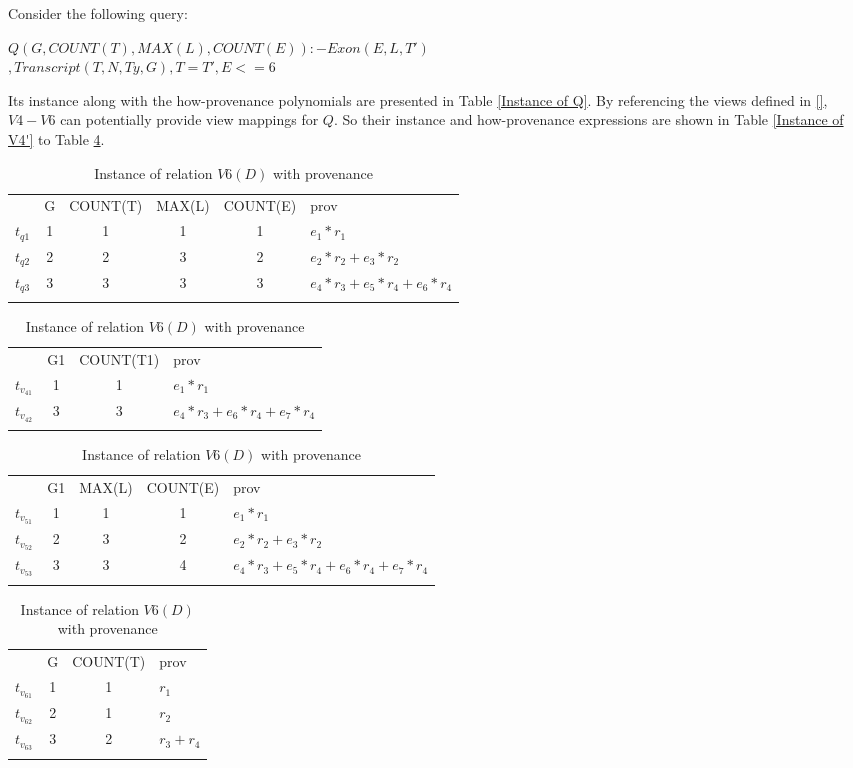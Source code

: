 \begin{example}
Consider the following query:
\begin{tabbing}
$Q(G, COUNT(T), MAX(L), COUNT(E)):-Exon(E, L, T')$\\
\tab\tab$,Transcript(T, N, Ty, G), T = T', E <= 6$
\end{tabbing}

Its instance along with the how-provenance polynomials are presented in Table \ref{Instance of Q}. By referencing the views defined in \ref{}, $V4-V6$ can potentially provide view mappings for $Q$. So their instance and how-provenance expressions are shown in Table \ref{Instance of V4'} to Table \ref{Instance of V6'}.

\begin{table}[htp]
\centering
\small
\caption{$Q(D)$ with how-provenance polynomials}\label{Instance of Q}
\begin{tabular}[t]{c|c|c|c|c||b|} \hhline{~-----}
&G&COUNT(T)&MAX(L)&COUNT(E)&prov\\ \hhline{~-----}
$t_{q1}$&1&1&1&1&$e_1*r_1$\\ \hhline{~-----}
$t_{q2}$&2&2&3&2&$e_2*r_2 + e_3*r_2$\\ \hhline{~-----}
$t_{q3}$&3&3&3&3&$e_4*r_3 + e_5*r_4 + e_6*r_4$\\ \hhline{~-----}
\end{tabular}
\bigskip
\caption{$V_4(D)$ with how-provenance polynomials}\label{Instance of V4'}
\begin{tabular}[t]{c|c|c||b|} \hhline{~---}
&G1&COUNT(T1)&prov\\ \hhline{~---}
$t_{v_41}$&1&1&$e_1*r_1$\\ \hhline{~---}
$t_{v_42}$&3&3&$e_4*r_3 + e_6*r_4 + e_7*r_4$\\ \hhline{~---}
\end{tabular}
\bigskip
\caption{$V_5(D)$ with how-provenance polynomials}\label{Instance of V5'}
\begin{tabular}[t]{c|c|c|c||b|} \hhline{~----}
&G1&MAX(L)&COUNT(E)&prov\\ \hhline{~----}
$t_{v_51}$&1&1&1&$e_1*r_1$\\ \hhline{~----}
$t_{v_52}$&2&3&2&$e_2*r_2 + e_3*r_2$\\ \hhline{~----}
$t_{v_53}$&3&3&4&$e_4*r_3 + e_5*r_4 + e_6*r_4 + e_7*r_4$\\ \hhline{~----}
\end{tabular}
\bigskip
\caption{Instance of relation $V6(D)$ with provenance}\label{Instance of V6'}
\begin{tabular}[t]{c|c|c||b|} \hhline{~---}
&G&COUNT(T)&prov\\ \hhline{~---}
$t_{v_61}$&1&1&$r_1$\\ \hhline{~---}
$t_{v_62}$&2&1&$r_2$\\ \hhline{~---}
$t_{v_63}$&3&2&$r_3 + r_4$\\ \hhline{~---}
\end{tabular}



\end{table}
\end{example}
